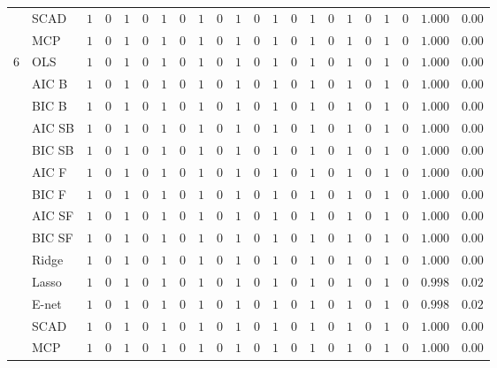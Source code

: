 \begin{tabular}{ll|ll|llllll|llllll|llllll}
	& SCAD  & $1$ & $0$ & $1$ & $0$ & $1$ & $0$ & $1$ & $0$ & $1$ & $0$ & $1$ & $0$ & $1$ & $0$ & $1$ & $0$ & $1$ & $0$ & $1.000$ & $0.00$ \\
	& MCP  & $1$ & $0$ & $1$ & $0$ & $1$ & $0$ & $1$ & $0$ & $1$ & $0$ & $1$ & $0$ & $1$ & $0$ & $1$ & $0$ & $1$ & $0$ & $1.000$ & $0.00$ \\\hline
	6 & OLS  & $1$ & $0$ & $1$ & $0$ & $1$ & $0$ & $1$ & $0$ & $1$ & $0$ & $1$ & $0$ & $1$ & $0$ & $1$ & $0$ & $1$ & $0$ & $1.000$ & $0.00$ \\
	& AIC B  & $1$ & $0$ & $1$ & $0$ & $1$ & $0$ & $1$ & $0$ & $1$ & $0$ & $1$ & $0$ & $1$ & $0$ & $1$ & $0$ & $1$ & $0$ & $1.000$ & $0.00$ \\
	& BIC B  & $1$ & $0$ & $1$ & $0$ & $1$ & $0$ & $1$ & $0$ & $1$ & $0$ & $1$ & $0$ & $1$ & $0$ & $1$ & $0$ & $1$ & $0$ & $1.000$ & $0.00$ \\
	& AIC SB  & $1$ & $0$ & $1$ & $0$ & $1$ & $0$ & $1$ & $0$ & $1$ & $0$ & $1$ & $0$ & $1$ & $0$ & $1$ & $0$ & $1$ & $0$ & $1.000$ & $0.00$ \\
	& BIC SB  & $1$ & $0$ & $1$ & $0$ & $1$ & $0$ & $1$ & $0$ & $1$ & $0$ & $1$ & $0$ & $1$ & $0$ & $1$ & $0$ & $1$ & $0$ & $1.000$ & $0.00$ \\
	& AIC F  & $1$ & $0$ & $1$ & $0$ & $1$ & $0$ & $1$ & $0$ & $1$ & $0$ & $1$ & $0$ & $1$ & $0$ & $1$ & $0$ & $1$ & $0$ & $1.000$ & $0.00$ \\
	& BIC F  & $1$ & $0$ & $1$ & $0$ & $1$ & $0$ & $1$ & $0$ & $1$ & $0$ & $1$ & $0$ & $1$ & $0$ & $1$ & $0$ & $1$ & $0$ & $1.000$ & $0.00$ \\
	& AIC SF  & $1$ & $0$ & $1$ & $0$ & $1$ & $0$ & $1$ & $0$ & $1$ & $0$ & $1$ & $0$ & $1$ & $0$ & $1$ & $0$ & $1$ & $0$ & $1.000$ & $0.00$ \\
	& BIC SF  & $1$ & $0$ & $1$ & $0$ & $1$ & $0$ & $1$ & $0$ & $1$ & $0$ & $1$ & $0$ & $1$ & $0$ & $1$ & $0$ & $1$ & $0$ & $1.000$ & $0.00$ \\
	& Ridge  & $1$ & $0$ & $1$ & $0$ & $1$ & $0$ & $1$ & $0$ & $1$ & $0$ & $1$ & $0$ & $1$ & $0$ & $1$ & $0$ & $1$ & $0$ & $1.000$ & $0.00$ \\
	& Lasso  & $1$ & $0$ & $1$ & $0$ & $1$ & $0$ & $1$ & $0$ & $1$ & $0$ & $1$ & $0$ & $1$ & $0$ & $1$ & $0$ & $1$ & $0$ & $0.998$ & $0.02$ \\
	& E-net  & $1$ & $0$ & $1$ & $0$ & $1$ & $0$ & $1$ & $0$ & $1$ & $0$ & $1$ & $0$ & $1$ & $0$ & $1$ & $0$ & $1$ & $0$ & $0.998$ & $0.02$ \\
	& SCAD  & $1$ & $0$ & $1$ & $0$ & $1$ & $0$ & $1$ & $0$ & $1$ & $0$ & $1$ & $0$ & $1$ & $0$ & $1$ & $0$ & $1$ & $0$ & $1.000$ & $0.00$ \\
	& MCP  & $1$ & $0$ & $1$ & $0$ & $1$ & $0$ & $1$ & $0$ & $1$ & $0$ & $1$ & $0$ & $1$ & $0$ & $1$ & $0$ & $1$ & $0$ & $1.000$ & $0.00$ \\
	\hline 
\end{tabular}